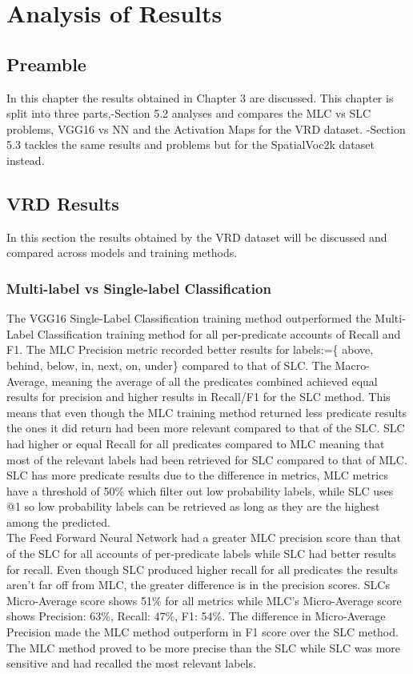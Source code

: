 \documentclass{csfyp}
\begin{document}
\section{Analysis of Results}
\subsection{Preamble}
In this chapter the results obtained in Chapter 3 are discussed. This chapter is split into three parts,-Section 5.2 analyses and compares the MLC vs SLC problems, VGG16 vs NN and the Activation Maps for the VRD dataset. -Section 5.3 tackles the same results and problems but for the SpatialVoc2k dataset instead.

\subsection{VRD Results}
In this section the results obtained by the VRD dataset will be discussed and compared across models and training methods.

\subsubsection{Multi-label vs Single-label Classification}
The VGG16 Single-Label Classification training method outperformed the Multi-Label Classification training method for all per-predicate accounts of Recall and F1. The MLC Precision metric recorded better results for labels:=\{ above, behind, below, in, next, on, under\} compared to that of SLC. The Macro-Average, meaning the average of all the predicates combined achieved equal results for precision and higher results in Recall/F1 for the SLC method. This means that even though the MLC training method returned less predicate results the ones it did return had been more relevant compared to that of the SLC. SLC had higher or equal Recall for all predicates compared to MLC meaning that most of the relevant labels had been retrieved for SLC compared to that of MLC. SLC has more predicate results due to the difference in metrics, MLC metrics have a threshold of 50\% which filter out low probability labels, while SLC uses @1 so low probability labels can be retrieved as long as they are the highest among the predicted. 
\\
The Feed Forward Neural Network had a greater MLC precision score than that of the SLC for all accounts of per-predicate labels while SLC had better results for recall. Even though SLC produced higher recall for all predicates the results aren't far off from MLC, the greater difference is in the precision scores. SLCs Micro-Average score shows 51\% for all metrics while MLC's Micro-Average score shows Precision: 63\%, Recall: 47\%, F1: 54\%. The difference in Micro-Average Precision made the MLC method outperform in F1 score over the SLC method.
\\
The MLC method proved to be more precise than the SLC while SLC was more sensitive and had recalled the most relevant labels.
\end{document}

